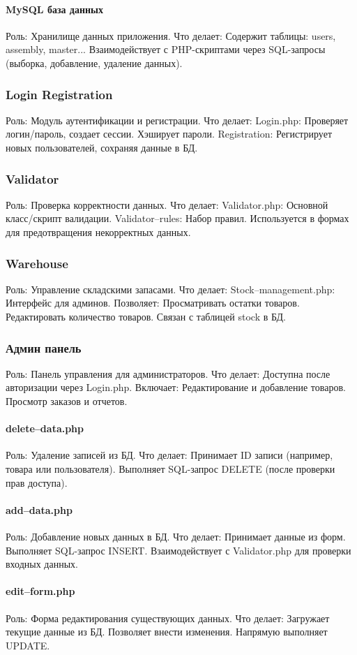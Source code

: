 \paragraph{MySQL база данных} 
Роль:
Хранилище данных приложения.
Что делает:
Содержит таблицы: users, assembly, master...
Взаимодействует с PHP-скриптами через SQL-запросы (выборка, добавление, удаление данных).
\subsubsection{Login Registration}
Роль:
Модуль аутентификации и регистрации.
Что делает:
Login.php: Проверяет логин/пароль, создает сессии.
Хэширует пароли.
Registration: Регистрирует новых пользователей, сохраняя данные в БД.
\subsubsection{Validator}
Роль:
Проверка корректности данных.
Что делает:
Validator.php: Основной класс/скрипт валидации.
Validator--rules: Набор правил.
Используется в формах для предотвращения некорректных данных.
\subsubsection{Warehouse}
Роль:
Управление складскими запасами.
Что делает:
Stock--management.php: Интерфейс для админов. Позволяет:
Просматривать остатки товаров.
Редактировать количество товаров.
Связан с таблицей stock в БД.
\subsubsection{Админ панель}
Роль:
Панель управления для администраторов.
Что делает:
Доступна после авторизации через Login.php.
Включает:
Редактирование и добавление товаров.
Просмотр заказов и отчетов.
\paragraph{delete--data.php}
Роль:
Удаление записей из БД.
Что делает:
Принимает ID записи (например, товара или пользователя).
Выполняет SQL-запрос DELETE (после проверки прав доступа).
\paragraph{add--data.php}
Роль:
Добавление новых данных в БД.
Что делает:
Принимает данные из форм.
Выполняет SQL-запрос INSERT.
Взаимодействует с Validator.php для проверки входных данных.
\paragraph{edit--form.php}
Роль:
Форма редактирования существующих данных.
Что делает:
Загружает текущие данные из БД.
Позволяет внести изменения.
Напрямую выполняет UPDATE.
